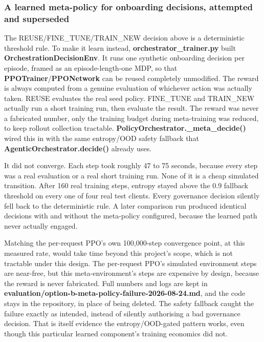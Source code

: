 \hypertarget{learned-meta-policy-attempted}{%
\subsubsection{A learned meta-policy for onboarding decisions,
attempted and superseded}\label{learned-meta-policy-attempted}}

The REUSE/FINE\_TUNE/TRAIN\_NEW decision above is a deterministic
threshold rule. To make it learn instead,
\textbf{orchestrator\_trainer.py} built
\textbf{OrchestrationDecisionEnv}. It runs one synthetic onboarding
decision per episode, framed as an episode-length-one MDP, so that
\textbf{PPOTrainer}/\textbf{PPONetwork} can be reused completely
unmodified. The reward is always computed from a genuine evaluation of
whichever action was actually taken. REUSE evaluates the real seed
policy. FINE\_TUNE and TRAIN\_NEW actually run a short training run,
then evaluate the result. The reward was never a fabricated number,
only the training budget during meta-training was reduced, to keep
rollout collection tractable.
\textbf{PolicyOrchestrator.\_meta\_decide()} wired this in with the
same entropy/OOD safety fallback that
\textbf{AgenticOrchestrator.decide()} already uses.

It did not converge. Each step took roughly 47 to 75 seconds, because
every step was a real evaluation or a real short training run. None of
it is a cheap simulated transition. After 160 real training steps, entropy
stayed above the 0.9 fallback threshold on every one of four real test
clients. Every governance decision silently fell back to the
deterministic rule. A later comparison run produced identical decisions
with and without the meta-policy configured, because the learned path
never actually engaged.

Matching the per-request PPO's own 100,000-step convergence point, at
this measured rate, would take time beyond this project's scope,
which is not tractable under this design. The per-request PPO's simulated environment steps
are near-free, but this meta-environment's steps are expensive by
design, because the reward is never fabricated. Full numbers and logs
are kept in \textbf{evaluation/option-b-meta-policy-failure-2026-08-24.md},
and the code stays in the repository, in place of being deleted. The
safety fallback caught the failure exactly as intended, instead of
silently authorising a bad governance decision. That is itself evidence
the entropy/OOD-gated pattern works, even though this particular
learned component's training economics did not.

